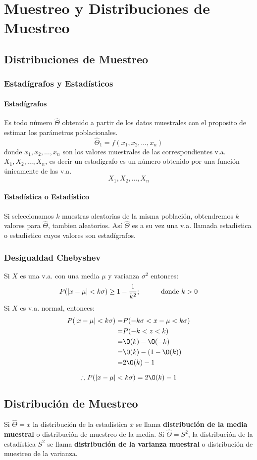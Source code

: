 \chapter{Muestreo y Distribuciones de Muestreo}
\section{Distribuciones de Muestreo}
\subsection{Estadígrafos y Estadísticos}
\subsubsection*{Estadígrafos}
Es todo número $\widehat{\Theta}$ obtenido a partir de los datos muestrales con el proposito de estimar los parámetros poblacionales.
$$ \widehat{\Theta}_1 = f(x_1,x_2,\ldots,x_n)$$
donde $x_1,x_2,\ldots,x_n$ son los valores muestrales de las correspondientes v.a. $X_1,X_2,\ldots,X_n$, es decir un estadigrafo es un número obtenido por una función únicamente de las v.a.
$$X_1,X_2,\ldots,X_n$$
\subsubsection*{Estadística o Estadístico}
Si seleccionamos $k$ muestras aleatorias de la misma población, obtendremos $k$ valores para $\widehat{\Theta}$, tambien aleatorios. Así $\widehat{\Theta}$ es a su vez una v.a. llamada estadística o estadístico cuyos valores son estadígrafos.
\subsection{Desigualdad Chebyshev}
Si $X$ es una v.a. con una media $\mu$ y varianza $\sigma^2$ entonces:
$$ P(|x-\mu| < k\sigma ) \geq 1 - \dfrac{1}{k^2} \text{;\hspace{1cm} donde $k>0$}$$
Si $X$ es v.a. normal, entonces:
\begin{align*}
P(|x-\mu| < k\sigma ) = & P( -k\sigma < x-\mu < k\sigma ) \\
			    =  &   P( -k < z < k ) \\
			     = & \O(k)- \O(-k) \\
			      =&\O(k) - (1-\O(k))\\
			      =& 2\O(k) -1
\end{align*}

$$\therefore P(|x-\mu| < k\sigma ) = 2\O(k)-1$$
\section{Distribución de Muestreo}
Si $\widehat{\Theta} = \overline{x}$ la distribución de la estadística $\overline{x}$ se llama \textbf{distribución de la media muestral} o distribución de muestreo de la media. Si $\widehat{\Theta}=S^2$, la distribución de la estadística $S^2$ se llama \textbf{distribución de la varianza muestral} o distribución de muestreo de la varianza.
